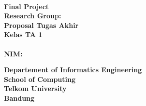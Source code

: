 {\centering
\large
{\bigsize\bf \Title}\\
\vspace{ 2cm}
\rm
\iflogTA
\textbf{Final Project}\\
\vspace{0.5 cm}
\textbf{Research Group: \KK}\\
\else
\textbf{Proposal Tugas Akhir}\\
\vspace{0.5 cm}
\textbf{Kelas TA 1}\\
\fi
\vspace{0.5 cm}
\textbf{\Author}\\ \textbf{NIM: \NIM}\\ 

\vspace{1.5 cm}

\begin{figure}[h]
{\par}
\end{figure}

\vspace{2 cm}
{\bigsize\textbf{Departement of Informatics Engineering}\\
\vspace{0.5 cm}
\textbf{School of Computing}\\
\vspace{0.5 cm}
\textbf{Telkom University}\\
\vspace{0.5 cm}
\textbf{Bandung}\\
\vspace{0.5 cm}
\textbf{\Date}\\}
}